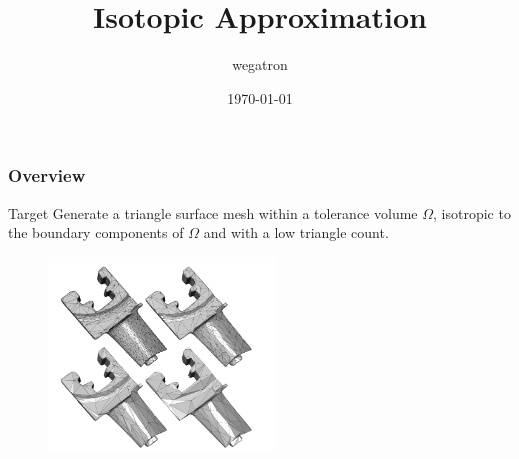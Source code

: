 \documentclass{beamer}
\title[Isotopic Approximation]{Isotopic Approximation} %
\author{wegatron} %
\institute[ZJU] %
{
ZJU\\ %
\medskip
}
\date{\today} %
\begin{document}
\begin{frame}
\titlepage %
\end{frame}

\begin{frame}
\frametitle{Overview} %
\tableofcontents %
\begin{block}{Target}
Generate a triangle surface mesh within a tolerance volume $\Omega$, isotropic to the boundary components of $\Omega$ and with a low triangle count.
\end{block}
\begin{example}[Result]
  \begin{figure}[h]
    \includegraphics[width=6cm]{res}
  \end{figure}
\end{example}
\end{frame}


\end{document}
